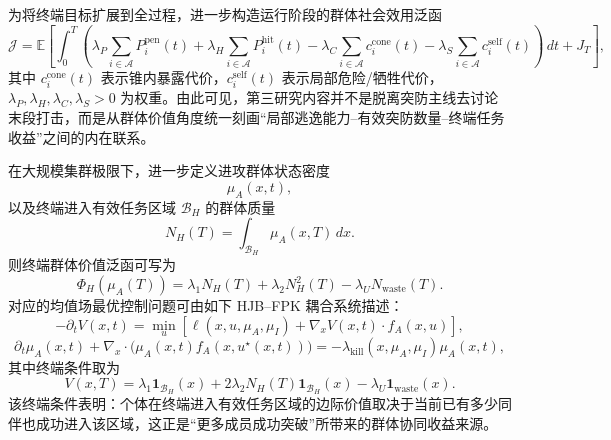 为将终端目标扩展到全过程，进一步构造运行阶段的群体社会效用泛函
\begin{equation}
\mathcal J
=
\mathbb E\left[
\int_0^T
\left(
\lambda_P \sum_{i\in\mathcal{A}} P_i^{\mathrm{pen}}(t)
+
\lambda_H \sum_{i\in\mathcal{A}} P_i^{\mathrm{hit}}(t)
-
\lambda_C \sum_{i\in\mathcal{A}} c_i^{\mathrm{cone}}(t)
-
\lambda_S \sum_{i\in\mathcal{A}} c_i^{\mathrm{self}}(t)
\right)\,dt
+
J_T
\right],
\end{equation}
其中 $c_i^{\mathrm{cone}}(t)$ 表示锥内暴露代价，$c_i^{\mathrm{self}}(t)$ 表示局部危险/牺牲代价，$\lambda_P,\lambda_H,\lambda_C,\lambda_S>0$ 为权重。由此可见，第三研究内容并不是脱离突防主线去讨论末段打击，而是从群体价值角度统一刻画“局部逃逸能力--有效突防数量--终端任务收益”之间的内在联系。

在大规模集群极限下，进一步定义进攻群体状态密度
\begin{equation}
\mu_A(x,t),
\end{equation}
以及终端进入有效任务区域 $\mathcal B_H$ 的群体质量
\begin{equation}
N_H(T)=\int_{\mathcal B_H}\mu_A(x,T)\,dx.
\end{equation}
则终端群体价值泛函可写为
\begin{equation}
\Phi_H(\mu_A(T))
=
\lambda_1 N_H(T)
+
\lambda_2 N_H^2(T)
-
\lambda_U N_{\mathrm{waste}}(T).
\end{equation}
对应的均值场最优控制问题可由如下 HJB--FPK 耦合系统描述：
\begin{equation}
-\partial_t V(x,t)
=
\min_{u}
\left[
\ell(x,u,\mu_A,\mu_I)
+
\nabla_x V(x,t)\cdot f_A(x,u)
\right],
\end{equation}
\begin{equation}
\partial_t \mu_A(x,t)
+
\nabla_x\cdot\bigl(\mu_A(x,t)f_A(x,u^{\star}(x,t))\bigr)
=
-\lambda_{\mathrm{kill}}(x,\mu_A,\mu_I)\mu_A(x,t),
\end{equation}
其中终端条件取为
\begin{equation}
V(x,T)
=
\lambda_1 \mathbf{1}_{\mathcal B_H}(x)
+
2\lambda_2 N_H(T)\mathbf{1}_{\mathcal B_H}(x)
-
\lambda_U \mathbf{1}_{\mathrm{waste}}(x).
\end{equation}
该终端条件表明：个体在终端进入有效任务区域的边际价值取决于当前已有多少同伴也成功进入该区域，这正是“更多成员成功突破”所带来的群体协同收益来源。

